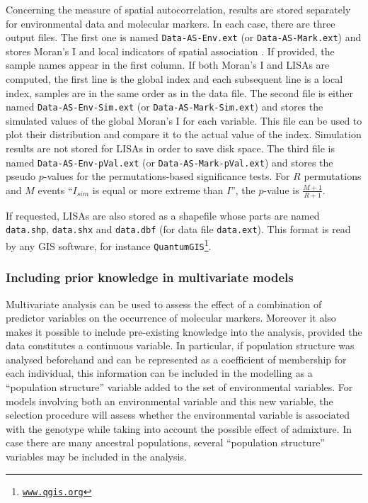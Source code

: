 \documentclass[a4paper,11pt]{article}
\newcommand{\prog}[1]{\texttt{#1}}
\begin{document}
Concerning the measure of spatial autocorrelation, results are stored separately for environmental data and molecular markers.
In each case, there are three output files.
The first one is named \prog{Data-AS-Env.ext} (or \prog{Data-AS-Mark.ext}) and stores Moran's I and local indicators of spatial association \parencite{anselin:1995}.
If provided, the sample names appear in the first column.
If both Moran's I and LISAs are computed, the first line is the global index and each subsequent line is a local index, samples are in the same order as in the data file.
The second file is either named \prog{Data-AS-Env-Sim.ext} (or \prog{Data-AS-Mark-Sim.ext}) and stores the simulated values of the global Moran's I for each variable.
This file can be used to plot their distribution and compare it to the actual value of the index.
Simulation results are not stored for LISAs in order to save disk space.
The third file is named \prog{Data-AS-Env-pVal.ext} (or \prog{Data-AS-Mark-pVal.ext}) and stores the pseudo $p$-values for the permutations-based significance tests.
For $R$ permutations and $M$ events \enquote{$I_{sim}$ is equal or more extreme than $I$}, the $p$-value is $\frac{M+1}{R+1}$.

If requested, LISAs are also stored as a shapefile whose parts are named \prog{data.shp}, \prog{data.shx} and \prog{data.dbf} (for data file \prog{data.ext}).
This format is read by any GIS software, for instance \prog{QuantumGIS\footnote{\url{www.qgis.org}}}.


\subsubsection{Including prior knowledge in multivariate models\label{sec:prior-knowledge}}
Multivariate analysis can be used to assess the effect of a combination of predictor variables on the occurrence of molecular markers.
Moreover it also makes it possible to include pre-existing knowledge into the analysis, provided the data constitutes a continuous variable. 
In particular, if population structure was analysed beforehand and can be represented as a coefficient of membership for each individual, this information can be included in the modelling as a  \enquote{population structure} variable added to the set of environmental variables.
For models involving both an environmental variable and this new variable, the selection procedure will assess whether the environmental variable is associated with the genotype while taking into account the possible effect of admixture.
In case there are many ancestral populations, several \enquote{population structure} variables may be included in the analysis.
\end{document}
